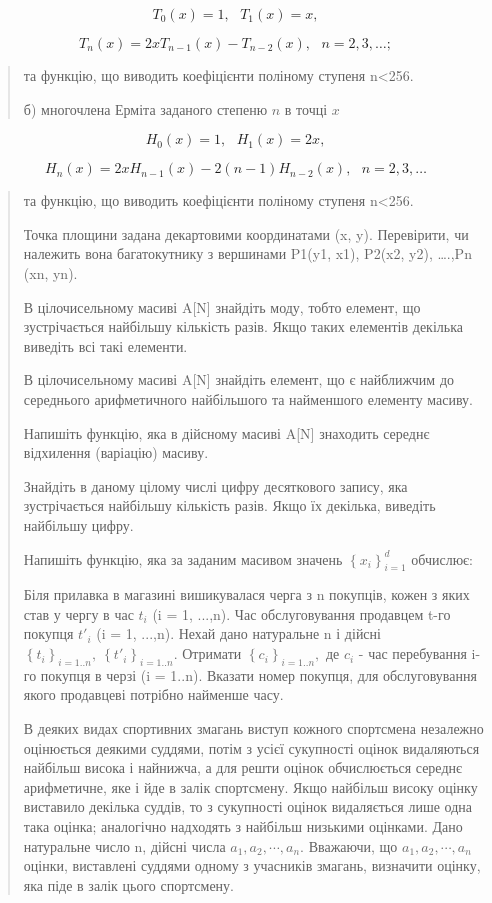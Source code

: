 \documentclass[]{article}
\begin{document}
\[T_{0}(x) = 1,\mathrm{\text{\ \ }}T_{1}(x) = x,\]

\[T_{n}(x) = 2xT_{n - 1}(x) - T_{n - 2}(x),\mathrm{\text{\ \ }}n = 2,3,\ldots;\]

\begin{quote}
та функцію, що виводить коефіцієнти поліному ступеня n\textless{}256.

б) многочлена Ерміта заданого степеню \(n\) в точці \(x\)
\end{quote}

\[H_{0}(x) = 1,\mathrm{\text{\ \ }}H_{1}(x) = 2x,\]

\[H_{n}(x) = 2xH_{n - 1}(x) - 2(n - 1)H_{n - 2}(x),\mathrm{\text{\ \ \ \ \ \ }}n = 2,3,\ldots\]

\begin{quote}
та функцію, що виводить коефіцієнти поліному ступеня n\textless{}256.

Точка площини задана декартовими координатами (x, y). Перевірити, чи
належить вона багатокутнику з вершинами P1(y1, x1), P2(x2, y2),
\ldots{}.,Pn (xn, yn).

В цілочисельному масиві A{[}N{]} знайдіть моду, тобто елемент, що
зустрічається найбільшу кількість разів. Якщо таких елементів декілька
виведіть всі такі елементи.

В цілочисельному масиві A{[}N{]} знайдіть елемент, що є найближчим до
середнього арифметичного найбільшого та найменшого елементу масиву.

Напишіть функцію, яка в дійсному масиві A{[}N{]} знаходить середнє
відхилення (варіацію) масиву.

Знайдіть в даному цілому числі цифру десяткового запису, яка
зустрічається найбільшу кількість разів. Якщо їх декілька, виведіть
найбільшу цифру.

Напишіть функцію, яка за заданим масивом значень
\(\left\{ x_{i} \right\}_{i = 1}^{d}\) обчислює:



Біля прилавка в магазині вишикувалася черга з n покупців, кожен з яких
став у чергу в час \(t_{i}\) (i = 1, ...,n). Час обслуговування
продавцем t-го покупця \({t'}_{i}\) (i = 1, ...,n). Нехай дано
натуральне n і дійсні
\(\left\{ t_{i} \right\}_{i = 1..n},\ \left\{ {t'}_{i} \right\}_{i = 1..n}\).
Отримати \(\left\{ c_{i} \right\}_{i = 1..n},\) де \(c_{i}\) - час
перебування i-го покупця в черзі (i = 1..n). Вказати номер покупця, для
обслуговування якого продавцеві потрібно найменше часу.

В деяких видах спортивних змагань виступ кожного спортсмена незалежно
оцінюється деякими суддями, потім з усієї сукупності оцінок видаляються
найбільш висока і найнижча, а для решти оцінок обчислюється середнє
арифметичне, яке і йде в залік спортсмену. Якщо найбільш високу оцінку
виставило декілька суддів, то з сукупності оцінок видаляється лише одна
така оцінка; аналогічно надходять з найбільш низькими оцінками. Дано
натуральне число n, дійсні числа \(a_{1},a_{2},\cdots,a_{n}\). Вважаючи,
що \(a_{1},a_{2},\cdots,a_{n}\ \)оцінки, виставлені суддями одному з
учасників змагань, визначити оцінку, яка піде в залік цього спортсмену.


\end{quote}
\end{document}
